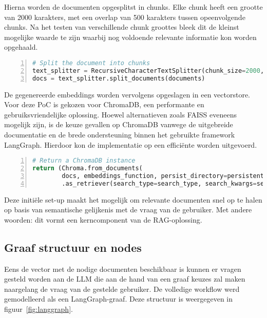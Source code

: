 Hierna worden de documenten opgesplitst in chunks. Elke chunk heeft een grootte van 2000 karakters, met een overlap van 500 karakters tussen opeenvolgende chunks. Na het testen van verschillende chunk groottes bleek dit de kleinst mogelijke waarde te zijn waarbij nog voldoende relevante informatie kon worden opgehaald.

\begin{lstlisting}[basicstyle=\small, frame=single, breaklines=true, postbreak=\mbox{\textcolor{red}{$\hookrightarrow$}\space}, escapeinside ={\%,}, escapechar={!}, numbers=left, language=Python, caption=Vector store build] 
# Split the document into chunks
text_splitter = RecursiveCharacterTextSplitter(chunk_size=2000, chunk_overlap=500)
docs = text_splitter.split_documents(documents)
\end{lstlisting}

De gegenereerde embeddings worden vervolgens opgeslagen in een vectorstore. Voor deze PoC is gekozen voor ChromaDB, een performante en gebruiksvriendelijke oplossing. Hoewel alternatieven zoals FAISS eveneens mogelijk zijn, is de keuze gevallen op ChromaDB vanwege de uitgebreide documentatie en de brede ondersteuning binnen het gebruikte framework LangGraph. Hierdoor kon de implementatie op een efficiënte worden uitgevoerd.

\begin{lstlisting}[basicstyle=\small, frame=single, breaklines=true, postbreak=\mbox{\textcolor{red}{$\hookrightarrow$}\space}, escapeinside ={\%,}, escapechar={!}, numbers=left, language=Python, caption=Vector store build]
# Return a ChromaDB instance
return (Chroma.from_documents(
        docs, embeddings_function, persist_directory=persistent_directory)
        .as_retriever(search_type=search_type, search_kwargs=search_kwargs))
\end{lstlisting}

Deze initiële set-up maakt het mogelijk om relevante documenten snel op te halen op basis van semantische gelijkenis met de vraag van de gebruiker. Met andere woorden: dit vormt een kerncomponent van de RAG-oplossing.

\subsection{Graaf structuur en nodes}

Eens de vector met de nodige documenten beschikbaar is kunnen er vragen gesteld worden aan de LLM die aan de hand van een graaf keuzes zal maken naargelang de vraag van de gestelde gebruiker. De volledige workflow werd gemodelleerd als een LangGraph-graaf. Deze structuur is weergegeven in figuur~\ref{fig:langgraph}.

